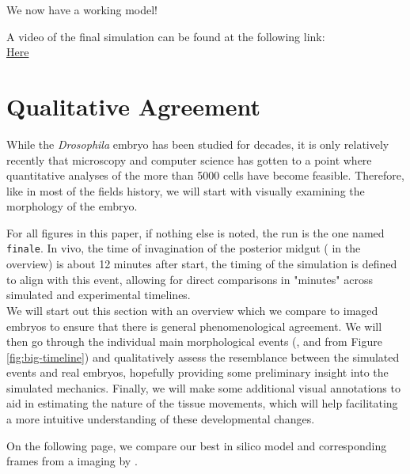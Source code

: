 We now have a working model! 

A video of the final simulation can be found at the following link:\\

\href{https://github.com/JakobSchauser/Thesis/blob/main/FinalVideos/finale.mp4}{Here}\\




\newpage


\section{Qualitative Agreement}
While the \textit{Drosophila} embryo has been studied for decades, it is only relatively recently that microscopy and computer science has gotten to a point where quantitative analyses of the more than 5000 cells have become feasible. Therefore, like in most of the fields history, we will start with visually examining the morphology of the embryo. 

For all figures in this paper, if nothing else is noted, the run is the one named \verb|finale|. In vivo, the time of invagination of the posterior midgut ( in the overview) is about 12 minutes after start, the timing of the simulation is defined to align with this event, allowing for direct comparisons in "minutes" across simulated and experimental timelines.\\


We will start out this section with an overview which we compare to imaged embryos to ensure that there is general phenomenological agreement. We will then go through the individual main morphological events (,  and  from Figure \ref{fig:big-timeline}) and qualitatively assess the resemblance between the simulated events and real embryos, hopefully providing some preliminary insight into the simulated mechanics. Finally, we will make some additional visual annotations to aid in estimating the nature of the tissue movements, which will help facilitating a more intuitive understanding of these developmental changes.

On the following page, we compare our best in silico model and corresponding frames from a imaging by .

